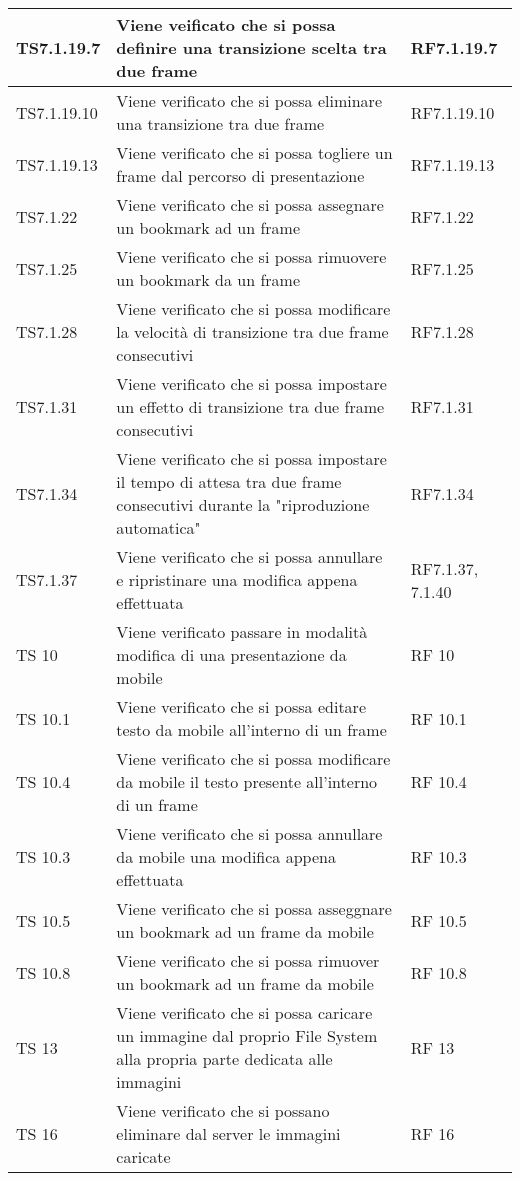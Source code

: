 {{\begin{longtable} [c]{| p{3cm} | p{6cm} |p{3cm}|}
			\hline
			TS7.1.19.7 & Viene veificato che si possa definire una transizione scelta tra due frame & RF7.1.19.7\\
			\hline
			TS7.1.19.10 & Viene verificato che si possa eliminare una transizione tra due frame & RF7.1.19.10\\
			\hline
			TS7.1.19.13 & Viene verificato che si possa togliere un frame dal percorso di presentazione & RF7.1.19.13\\
			\hline
			TS7.1.22 & Viene verificato che si possa assegnare un bookmark ad un frame & RF7.1.22\\
			\hline
			TS7.1.25 & Viene verificato che si possa rimuovere un bookmark da un frame & RF7.1.25\\
			\hline
			TS7.1.28 & Viene verificato che si possa modificare la velocità di transizione tra due frame consecutivi & RF7.1.28\\
			\hline
			TS7.1.31 & Viene verificato che si possa impostare un effetto di transizione tra due frame consecutivi & RF7.1.31\\
			\hline
			TS7.1.34 & Viene verificato che si possa impostare il tempo di attesa tra due frame consecutivi durante la "riproduzione automatica" & RF7.1.34\\
			\hline
			TS7.1.37 & Viene verificato che si possa annullare e ripristinare una modifica appena effettuata & RF7.1.37, 7.1.40\\
			\hline			 
			TS 10 & Viene verificato passare in modalità modifica di una presentazione da mobile & RF 10\\
			\hline
			TS 10.1 & Viene verificato che si possa editare testo da mobile all'interno di un frame & RF 10.1\\
			\hline
			TS 10.4 & Viene verificato che si possa modificare da mobile il testo presente all'interno di un frame & RF 10.4\\
			\hline
			TS 10.3 & Viene verificato che si possa annullare da mobile una modifica appena effettuata & RF 10.3\\
			\hline
			TS 10.5 & Viene verificato che si possa asseggnare un bookmark ad un frame da mobile & RF 10.5\\
			\hline
			TS 10.8 & Viene verificato che si possa rimuover un bookmark ad un frame da mobile & RF 10.8\\
			\hline
			TS 13 & Viene verificato che si possa caricare un immagine dal proprio File System alla propria parte dedicata alle immagini & RF 13\\
			\hline
			TS 16 & Viene verificato che si possano eliminare dal server le immagini caricate & RF 16\\

\end{longtable}}}
